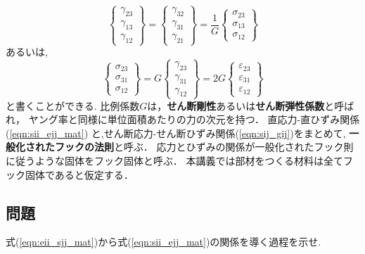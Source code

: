 \documentclass[10pt,a4j]{jbook}
\begin{document}
\begin{equation}
	\left\{ 
		\begin{array}{*{20}{c}}
		\gamma_{23}\\
		\gamma_{13}\\
		\gamma_{12}
		\end{array}
	\right\} 
	=
	\left\{ 
		\begin{array}{*{20}{c}}
		\gamma_{32}\\
		\gamma_{31}\\
		\gamma_{21}
		\end{array}
	\right\} 
	= \frac{1}{G}
	\left\{
		\begin{array}{*{20}{c}}
		\sigma _{23}\\
		\sigma _{13}\\
		\sigma _{12}
		\end{array}
	\right\}
	\label{eqn:gij_sij}
\end{equation}
あるいは,
\begin{equation}
	\left\{ 
		\begin{array}{*{20}{c}}
		\sigma_{23}\\
		\sigma_{31}\\
		\sigma_{12}
		\end{array}
	\right\} 
	=
	G
	\left\{
		\begin{array}{*{20}{c}}
		\gamma_{23}\\
		\gamma_{31}\\
		\gamma_{12}
		\end{array}
	\right\}
	=
	2G
	\left\{
		\begin{array}{*{20}{c}}
		\varepsilon_{23}\\
		\varepsilon_{31}\\
		\varepsilon_{12}
		\end{array}
	\right\}
	\label{eqn:sij_gij}
\end{equation}
と書くことができる.
比例係数$G$は，{\bf せん断剛性}あるいは{\bf せん断弾性係数}と呼ばれ，
ヤング率と同様に単位面積あたりの力の次元を持つ．
直応力-直ひずみ関係(\ref{eqn:sii_ejj_mat})
と,せん断応力-せん断ひずみ関係(\ref{eqn:sij_gij})をまとめて,
{\bf 一般化されたフックの法則}と呼ぶ．
応力とひずみの関係が一般化されたフック則に従うような固体をフック固体と呼ぶ．
本講義では部材をつくる材料は全てフック固体であると仮定する．
\subsection{問題}
式(\ref{eqn:eii_sjj_mat})から式(\ref{eqn:sii_ejj_mat})の関係を導く過程を示せ. 
\end{document}
